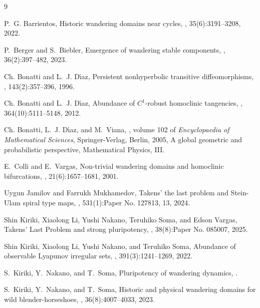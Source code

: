 \documentclass{amsart}
\theoremstyle{plain}
\theoremstyle{definition}
\theoremstyle{remark}
\numberwithin{equation}{section}
\begin{document}
\begin{thebibliography}{9}



P.~G. Barrientos, 
\newblock Historic wandering domains near cycles, 
, 35(6):3191--3208, 2022.

P.~Berger and S.~Biebler, 
\newblock Emergence of wandering stable components, 
, 36(2):397--482, 2023.

Ch. Bonatti and L.~J. D{\'{\i}}az, 
\newblock Persistent nonhyperbolic transitive diffeomorphisms, 
, 143(2):357--396, 1996.

Ch. Bonatti and L.~J. D{\'{\i}}az, 
\newblock Abundance of {$C^1$}-robust homoclinic tangencies, 
, 364(10):5111--5148, 2012.

Ch. Bonatti, L.~J. D{\'{\i}}az, and M.~Viana, 
, volume 102 of {\em
  Encyclopaedia of Mathematical Sciences}, 
\newblock Springer-Verlag, Berlin, 2005, 
\newblock A global geometric and probabilistic perspective, Mathematical
  Physics, III.

E.~Colli and E.~Vargas, 
\newblock Non-trivial wandering domains and homoclinic bifurcations, 
, 21(6):1657--1681, 2001.

Uygun Jamilov and Farrukh Mukhamedov, 
\newblock Takens' the last problem and {S}tein-{U}lam spiral type maps, 
, 531(1):Paper No. 127813, 13, 2024.

Shin Kiriki, Xiaolong Li, Yushi Nakano, Teruhiko Soma, and Edson Vargas, 
\newblock Takens' {L}ast {P}roblem and strong pluripotency, 
, 38(8):Paper No. 085007, 2025.

Shin Kiriki, Xiaolong Li, Yushi Nakano, and Teruhiko Soma, 
\newblock Abundance of observable {L}yapunov irregular sets, 
, 391(3):1241--1269, 2022.

S.~Kiriki, Y.~Nakano, and T.~Soma, 
\newblock Pluripotency of wandering dynamics, 
.

S.~Kiriki, Y.~Nakano, and T.~Soma, 
\newblock Historic and physical wandering domains for wild blender-horseshoes, 
, 36(8):4007--4033, 2023.


\end{thebibliography}
\end{document}
